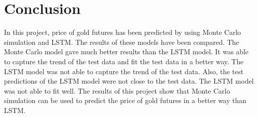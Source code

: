 \documentclass[12pt, a4paper]{article}
\begin{document}
\section{Conclusion}
In this project, price of gold futures has been predicted by using Monte Carlo simulation and LSTM.  The results of these models have been compared.  The Monte Carlo model gave much better results than the LSTM model.  It was able to capture the trend of the test data and fit the test data in a better way.  The LSTM model was not able to capture the trend of the test data.  Also, the test predictions of the LSTM model were not close to the test data.  The LSTM model was not able to fit well.  The results of this project show that Monte Carlo simulation can be used to predict the price of gold futures in a better way than LSTM.\\


\newpage
\printbibliography[heading=bibintoc]
\end{document}
